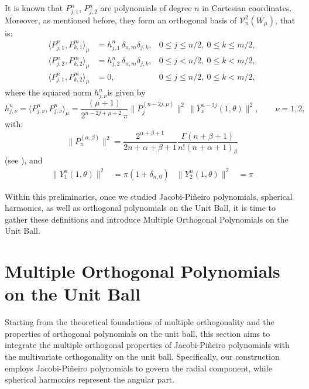 \documentclass[a4paper]{article}
\theoremstyle{plain}
\theoremstyle{definition}
\newcommand{\innerprod}[2]{\langle #1 , #2 \rangle}
\begin{document}
    It is known \cite[Proposition 2.3.3]{DX14} that $P^n_{j,1}$, $P^n_{j,2}$ are polynomials of degree $n$ in Cartesian coordinates. Moreover, as mentioned before, they form an orthogonal basis of $\mathcal{V}_n^2(W_\mu)$, that is:
    \begin{equation}
        \label{eq:pols-ball}
        \begin{aligned}
        \innerprod{P^n_{j,1}}{P^m_{k,1}}_\mu &= h_{j,1}^n\,\delta_{n,m}\delta_{j,k}, & 0\leq j\leq n/2, \ 0\leq k\leq m/2,\\
        \innerprod{P^n_{j,2}}{P^m_{k,2}}_\mu &= h_{j,2}^n\,\delta_{n,m}\delta_{j,k}, & 0\leq j< n/2, \ 0\leq k< m/2,\\
        \innerprod{P^n_{j,1}}{P^m_{k,2}}_\mu&=0, &0\leq j\leq n/2, \ 0\leq k< m/2,
        \end{aligned}
    \end{equation}
    where the squared norm $h_{j,\nu}^n$is given by
    $$
    h_{j,\nu}^n = \langle P^n_{j,\nu}, P^n_{j,\nu} \rangle_\mu = \dfrac{(\mu+1)}{2^{n-2j+\mu+2}\,\pi}\|P_j^{(n-2j,\mu)}\|^2 \, \|Y_\nu^{n-2j}(1,\theta)\|^2, \qquad \nu=1,2,
    $$
    with:
    \begin{equation}
        \label{eq:norm-jacobi}
        \|P_n^{(\alpha,\beta)}\|^2 = \dfrac{2^{\alpha+\beta+1}}{2n+\alpha+\beta+1}\dfrac{\Gamma(n+\beta+1)}{n! (n+\alpha+1)_{\beta}}
    \end{equation}
    (see \cite[Section 22.2.1]{AS64}), and
    \begin{align}
        \label{eq:norm-harmonics-2-var}
        \|Y_1^{n}(1,\theta)\|^2&= \pi(1+\delta_{n,0}) &
        \|Y_2^{n}(1,\theta)\|^2&= \pi
    \end{align}

    Within this preliminaries, once we studied Jacobi-Pi\~neiro polynomials, spherical harmonics, as well as orthogonal polynomials on the Unit Ball, it is time to gather these definitions and introduce Multiple Orthogonal Polynomials on the Unit Ball.

	\section{Multiple Orthogonal Polynomials on the Unit Ball}
	\label{sec:mop-ball}

    Starting from the theoretical foundations of multiple orthogonality and the properties of orthogonal polynomials on the unit ball, this section aims to integrate the multiple orthogonal properties of Jacobi-Pi\~neiro polynomials with the multivariate orthogonality on the unit ball. Specifically, our construction employs Jacobi-Pi\~neiro polynomials to govern the radial component, while spherical harmonics represent the angular part.
\end{document}
